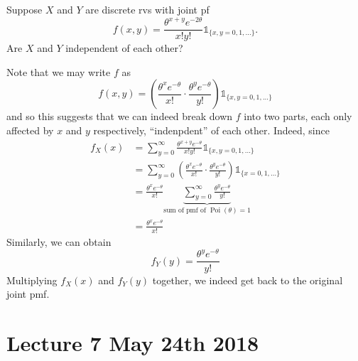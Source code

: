 \documentclass[notoc,notitlepage]{tufte-book}
\DeclareMathOperator{\Poi}{Poi }
\begin{document}
\begin{eg}[Example 3.6]
  Suppose $X$ and $Y$ are discrete rvs with joint pf
  \begin{equation*}
    f(x, y) = \frac{\theta^{x + y} e^{- 2 \theta}}{x! y!} \mathbb{1}_{\{x, y = 0, 1, ...\}}.
  \end{equation*}
  Are $X$ and $Y$ independent of each other?

  \begin{solution} 
    Note that we may write $f$ as
    \begin{equation*}
      f(x, y) = \left( \frac{\theta^x e^{-\theta}}{x!} \cdot \frac{\theta^y e^{- \theta}}{y!} \right) \mathbb{1}_{\{x, y = 0, 1, ...\}}
    \end{equation*}
    and so this suggests that we can indeed break down $f$ into two parts, each only affected by $x$ and $y$ respectively, ``indenpdent'' of each other. Indeed, since
    \begin{align*}
      f_X(x) &= \sum_{y = 0}^{\infty} \frac{\theta^{x + y} e^{- \theta}}{x! y!} \mathbb{1}_{\{x,y = 0, 1, ... \}} \\
        &= \sum_{y = 0}^{\infty} \left( \frac{\theta^x e^{-\theta}}{x!} \cdot \frac{\theta^y e^{- \theta}}{y!} \right) \mathbb{1}_{\{x = 0, 1, ...\}} \\
        &= \frac{\theta^x e^{-\theta}}{x!} \underbrace{ \sum_{y = 0}^{\infty} \frac{\theta^y e^{-\theta}}{y!} }_{\text{sum of pmf of } \Poi(\theta) = 1} \\
        &= \frac{\theta^x e^{-\theta}}{x!}
    \end{align*}
    Similarly, we can obtain
    \begin{equation*}
      f_Y(y) = \frac{\theta^y e^{-\theta}}{y!}
    \end{equation*}
    Multiplying $f_X(x)$ and $f_Y(y)$ together, we indeed get back to the original joint pmf.
  \end{solution}
\end{eg}




\chapter{Lecture 7 May 24th 2018}%
\label{chp:lecture_7_may_24th_2018}
\end{document}
